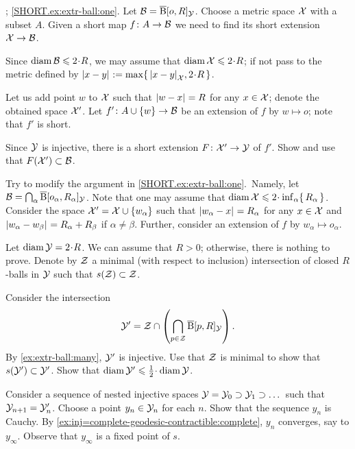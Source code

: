\parbf{\ref{ex:extr-ball}}; \ref{SHORT.ex:extr-ball:one}.
Let $\mathcal{B}=\overline{\mathrm{B}}{}[o,R]_{\mathcal{Y}}$.
Choose a metric space $\mathcal{X}$ with a subset $A$.
Given a short map $f\colon A\to \mathcal{B}$ we need to find its short extension $\mathcal{X}\to \mathcal{B}$.

Since $\diam\spc{B}\le 2\cdot R$, we may assume that  $\diam \spc{X}\le 2\cdot R$;
if not pass to the metric defined by $\dist{x}{y}{}\df\max\{\,\dist{x}{y}{\spc{X}},2\cdot R\,\}$.

Let us add point $w$ to $\mathcal{X}$ such that $\dist{w}{x}{}=R$ for any $x\in\mathcal{X}$;
denote the obtained space $\mathcal{X}'$.
Let $f'\colon A\cup\{w\}\to \mathcal{B}$ be an extension of $f$ by $w\mapsto o$; note that $f'$ is short.

Since $\mathcal{Y}$ is injective, there is a short extension $F\colon\mathcal{X}'\to \mathcal{Y}$ of $f'$.
Show and use that $F(\mathcal{X}')\subset \mathcal{B}$.

Try to modify the argument in \ref{SHORT.ex:extr-ball:one}.~Namely, let $\mathcal{B}=\bigcap_\alpha\overline{\mathrm{B}}{}[o_\alpha,R_\alpha]_{\mathcal{Y}}$.
Note that one may assume that $\diam \spc{X}\z\le 2\cdot \inf_\alpha\{\,R_\alpha\,\}$.
Consider the space $\spc{X}'\z=\spc{X}\cup\{w_\alpha\}$ such that $\dist{w_\alpha}{x}{}\z=R_\alpha$ for any $x\in \mathcal{X}$ and $\dist{w_\alpha}{w_\beta}{}=R_\alpha+R_\beta$ if $\alpha\ne\beta$.
Further, consider an extension of $f$ by $w_\alpha\mapsto o_\alpha$.

Let $\diam \spc{Y}=2\cdot R$.
We can assume that $R>0$; otherwise, there is nothing to prove.
Denote by $\mathcal{Z}$ a minimal (with respect to inclusion) intersection of closed $R$-balls in $\mathcal{Y}$ such that $s(\mathcal{Z})\subset\mathcal{Z}$.

Consider 
the intersection 
\[\mathcal{Y}'=\mathcal{Z}\cap\left(\bigcap_{p\in \mathcal{Z}} \overline{\mathrm{B}}{}[p,R]_{\mathcal{Y}}\right).\]
By \ref{ex:extr-ball:many}, $\mathcal{Y}'$ is injective.
Use that $\mathcal{Z}$ is minimal to show that $s(\mathcal{Y}')\subset \mathcal{Y}'$.
Show that $\diam \spc{Y}'\le \tfrac12\cdot\diam \spc{Y}$.

Consider a sequence of nested injective spaces $\mathcal{Y}=\mathcal{Y}_0\supset \mathcal{Y}_1\supset\dots$ such that $\spc{Y}_{n+1}\z=\spc{Y}_{n}'$.
Choose a point $y_n\in \mathcal{Y}_{n}$ for each $n$.
Show that the sequence $y_n$ is Cauchy.
By \ref{ex:inj=complete-geodesic-contractible:complete}, $y_n$ converges, say to $y_\infty$.
Observe that $y_\infty$ is a fixed point of $s$.

